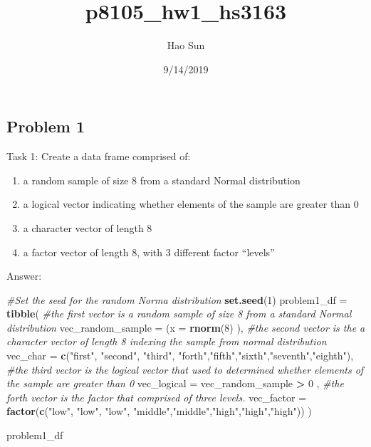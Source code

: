 \documentclass[]{article}
\title{p8105\_hw1\_hs3163}
\author{Hao Sun}
\date{9/14/2019}
\newenvironment{Shaded}{\begin{snugshade}}{\end{snugshade}}
\newcommand{\CommentTok}[1]{\textcolor[rgb]{0.56,0.35,0.01}{\textit{#1}}}
\newcommand{\DataTypeTok}[1]{\textcolor[rgb]{0.13,0.29,0.53}{#1}}
\newcommand{\DecValTok}[1]{\textcolor[rgb]{0.00,0.00,0.81}{#1}}
\newcommand{\KeywordTok}[1]{\textcolor[rgb]{0.13,0.29,0.53}{\textbf{#1}}}
\newcommand{\NormalTok}[1]{#1}
\newcommand{\OperatorTok}[1]{\textcolor[rgb]{0.81,0.36,0.00}{\textbf{#1}}}
\newcommand{\StringTok}[1]{\textcolor[rgb]{0.31,0.60,0.02}{#1}}
\providecommand{\tightlist}{%
  \setlength{\itemsep}{0pt}\setlength{\parskip}{0pt}}
\begin{document}
\maketitle

\hypertarget{problem-1}{%
\subsection{Problem 1}\label{problem-1}}

Task 1: Create a data frame comprised of:

\begin{enumerate}
\def\labelenumi{\arabic{enumi}.}
\tightlist
\item
  a random sample of size 8 from a standard Normal distribution
\item
  a logical vector indicating whether elements of the sample are greater
  than 0
\item
  a character vector of length 8
\item
  a factor vector of length 8, with 3 different factor ``levels''
\end{enumerate}

Answer:

\begin{Shaded}
\begin{Highlighting}[]
\CommentTok{#Set the seed for the random Norma distribution}
\KeywordTok{set.seed}\NormalTok{(}\DecValTok{1}\NormalTok{)}
\NormalTok{problem1_df =}\StringTok{ }\KeywordTok{tibble}\NormalTok{(}
  \CommentTok{#the first vector is a random sample of size 8 from a standard Normal distribution}
  \DataTypeTok{vec_random_sample =}\NormalTok{ (}\DataTypeTok{x =} \KeywordTok{rnorm}\NormalTok{(}\DecValTok{8}\NormalTok{) ),}
  \CommentTok{#the second vector is the a character vector of length 8 indexing the sample from normal distribution}
  \DataTypeTok{vec_char =} \KeywordTok{c}\NormalTok{(}\StringTok{"first"}\NormalTok{, }\StringTok{"second"}\NormalTok{, }\StringTok{"third"}\NormalTok{, }\StringTok{"forth"}\NormalTok{,}\StringTok{"fifth"}\NormalTok{,}\StringTok{"sixth"}\NormalTok{,}\StringTok{"seventh"}\NormalTok{,}\StringTok{"eighth"}\NormalTok{),}
  \CommentTok{#the third vector is the logical vector that used to determined whether elements of the sample are greater than 0}
  \DataTypeTok{vec_logical =}\NormalTok{ vec_random_sample }\OperatorTok{>}\StringTok{ }\DecValTok{0}\NormalTok{ ,}
  \CommentTok{#the forth vector is the factor that comprised of three levels.}
  \DataTypeTok{vec_factor =} \KeywordTok{factor}\NormalTok{(}\KeywordTok{c}\NormalTok{(}\StringTok{"low"}\NormalTok{, }\StringTok{"low"}\NormalTok{, }\StringTok{"low"}\NormalTok{, }\StringTok{"middle"}\NormalTok{,}\StringTok{"middle"}\NormalTok{,}\StringTok{"high"}\NormalTok{,}\StringTok{"high"}\NormalTok{,}\StringTok{"high"}\NormalTok{))}
\NormalTok{)}
  
\NormalTok{problem1_df}
\end{Highlighting}
\end{Shaded}
\end{document}
